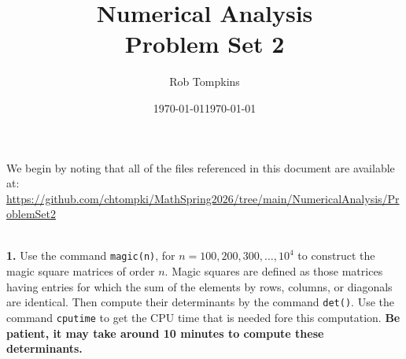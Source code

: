 \documentclass[12pt]{amsart}
\title{Numerical Analysis\\Problem Set 2}
\author{Rob Tompkins}
\date{\today}
\begin{document}
    \maketitle
    \date{\today}
    \begin{onehalfspace}
        We begin by noting that all of the files referenced in this document are available at: \\
        \underline{https://github.com/chtompki/MathSpring2026/tree/main/NumericalAnalysis/ProblemSet2}

        \quad\\
        \textbf{1.} Use the command \texttt{magic(n)}, for $n=100,200,300,\ldots,10^4$ to construct the magic square
        matrices of order $n$.
        Magic squares are defined as those matrices having entries for which the sum of the elements by rows, columns,
        or diagonals are identical.
        Then compute their determinants by the command \texttt{det()}.
        Use the command \texttt{cputime} to get the CPU time that is needed fore this computation.
        \textbf{Be patient, it may take around 10 minutes to compute these determinants.}


\end{onehalfspace}
\end{document}

